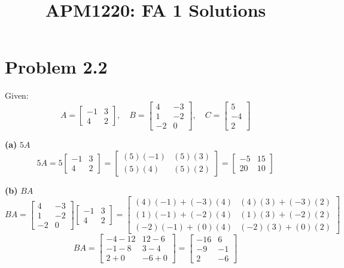 \documentclass{article}
\title{APM1220: FA 1 Solutions}
\author{}
\date{}
\begin{document}
\maketitle

\section*{Problem 2.2}
Given:
\[
A = \begin{bmatrix} -1 & 3 \\ 4 & 2 \end{bmatrix}, \quad
B = \begin{bmatrix} 4 & -3 \\ 1 & -2 \\ -2 & 0 \end{bmatrix}, \quad
C = \begin{bmatrix} 5 \\ -4 \\ 2 \end{bmatrix}
\]

\noindent \textbf{(a)} $5A$
\[
5A = 5 \begin{bmatrix} -1 & 3 \\ 4 & 2 \end{bmatrix} = \begin{bmatrix} (5)(-1) & (5)(3) \\ (5)(4) & (5)(2) \end{bmatrix} = \begin{bmatrix} -5 & 15 \\ 20 & 10 \end{bmatrix}
\]

\noindent \textbf{(b)} $BA$
\[
BA = \begin{bmatrix} 4 & -3 \\ 1 & -2 \\ -2 & 0 \end{bmatrix} \begin{bmatrix} -1 & 3 \\ 4 & 2 \end{bmatrix} = \begin{bmatrix} (4)(-1)+(-3)(4) & (4)(3)+(-3)(2) \\ (1)(-1)+(-2)(4) & (1)(3)+(-2)(2) \\ (-2)(-1)+(0)(4) & (-2)(3)+(0)(2) \end{bmatrix} 
\]
\[
BA = \begin{bmatrix} -4 - 12 & 12 - 6 \\ -1 - 8 & 3 - 4 \\ 2 + 0 & -6 + 0 \end{bmatrix} = \begin{bmatrix} -16 & 6 \\ -9 & -1 \\ 2 & -6 \end{bmatrix}
\]
\end{document}
